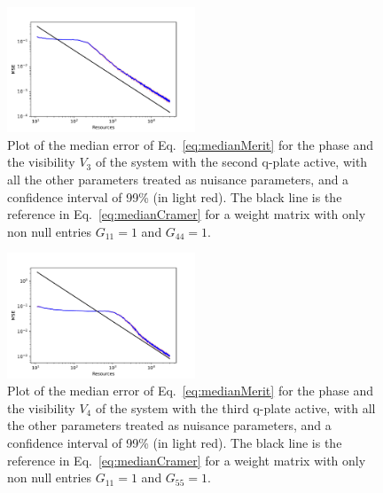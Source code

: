 \documentclass[aps, pra, 10pt, twocolumn, superscriptaddress,floatfix]{revtex4-1}
\begin{document}
\begin{figure}[!th]
	\begin{center}
		\includegraphics[width=0.5\textwidth]{phaseAndVisibilities/estimation1001010010.pdf}
	\end{center}
	\caption{Plot of the median error of Eq.~\eqref{eq:medianMerit} for the phase and the visibility $V_3$ of the system with the second q-plate active, with all the other parameters treated as nuisance parameters, and a confidence interval of 99\% (in light red). The black line is the reference in Eq.~\eqref{eq:medianCramer} for a weight matrix with only non null entries $G_{11} = 1$ and $G_{44} = 1$.}
	\label{fig:estimation10010}
\end{figure}
%
\begin{figure}[!th]
	\begin{center}
		\includegraphics[width=0.5\textwidth]{phaseAndVisibilities/estimation1000110001.pdf}
	\end{center}
	\caption{Plot of the median error of Eq.~\eqref{eq:medianMerit} for the phase and the visibility $V_4$ of the system with the third q-plate active, with all the other parameters treated as nuisance parameters, and a confidence interval of 99\% (in light red). The black line is the reference in Eq.~\eqref{eq:medianCramer} for a weight matrix with only non null entries $G_{11} = 1$ and $G_{55} = 1$.}
	\label{fig:estimation10001}
\end{figure}
%
\end{document}

